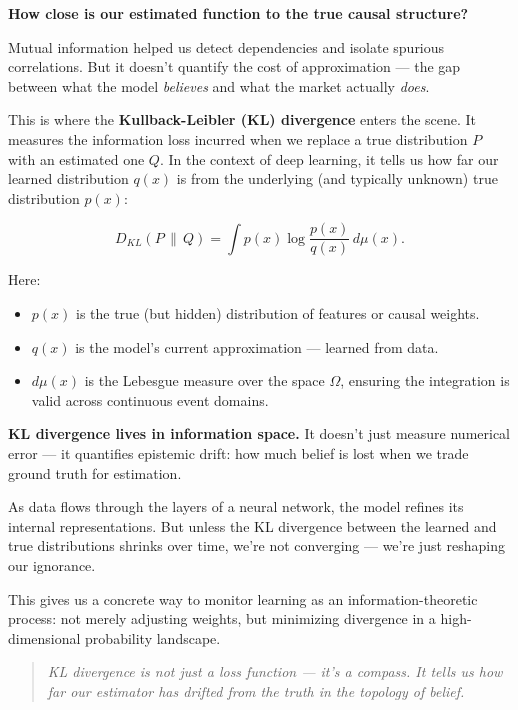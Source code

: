 \textbf{How close is our estimated function to the true causal structure?}

Mutual information helped us detect dependencies and isolate spurious correlations. But it doesn’t quantify the cost of approximation — the gap between what the model \textit{believes} and what the market actually \textit{does}.

This is where the \textbf{Kullback-Leibler (KL) divergence} enters the scene. It measures the information loss incurred when we replace a true distribution \( P \) with an estimated one \( Q \). In the context of deep learning, it tells us how far our learned distribution \( q(x) \) is from the underlying (and typically unknown) true distribution \( p(x) \):

\[
D_{KL}(P \,\|\, Q) = \int p(x) \log \frac{p(x)}{q(x)} \, d\mu(x).
\]

\vspace{0.5em}
Here:
\begin{itemize}
    \item \( p(x) \) is the true (but hidden) distribution of features or causal weights.
    \item \( q(x) \) is the model's current approximation — learned from data.
    \item \( d\mu(x) \) is the Lebesgue measure over the space \( \Omega \), ensuring the integration is valid across continuous event domains.
\end{itemize}

\textbf{KL divergence lives in information space.} It doesn't just measure numerical error — it quantifies epistemic drift: how much belief is lost when we trade ground truth for estimation.

As data flows through the layers of a neural network, the model refines its internal representations. But unless the KL divergence between the learned and true distributions shrinks over time, we're not converging — we're just reshaping our ignorance.

\vspace{0.5em}
\noindent
This gives us a concrete way to monitor learning as an information-theoretic process: not merely adjusting weights, but minimizing divergence in a high-dimensional probability landscape.

\begin{quote}
\textit{KL divergence is not just a loss function — it's a compass. It tells us how far our estimator has drifted from the truth in the topology of belief.}
\end{quote}

